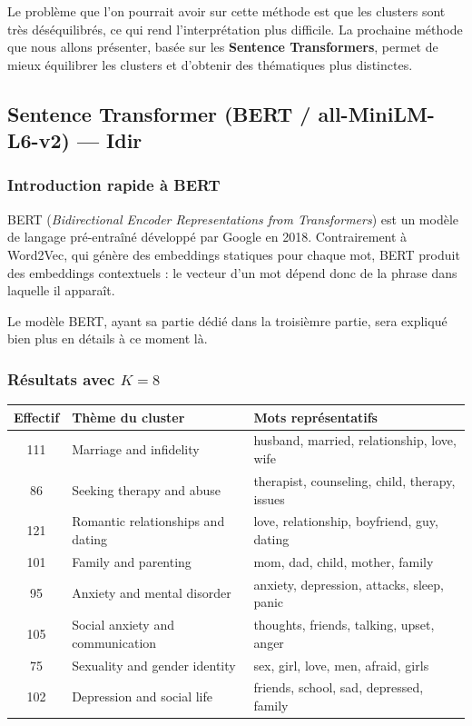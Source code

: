 \documentclass[12pt,a4paper]{report}
\begin{document}
Le problème que l'on pourrait avoir sur cette méthode est que les clusters sont très déséquilibrés, ce qui rend l'interprétation plus difficile.
La prochaine méthode que nous allons présenter, basée sur les \textbf{Sentence Transformers}, permet de mieux équilibrer les clusters et d'obtenir des thématiques plus distinctes.

\pagebreak

\subsection{Sentence Transformer (BERT / all-MiniLM-L6-v2) — Idir}

\subsubsection{Introduction rapide à BERT}
BERT (\textit{Bidirectional Encoder Representations from Transformers}) est un modèle de langage pré-entraîné développé par Google en 2018. 
Contrairement à Word2Vec, qui génère des embeddings statiques pour chaque mot, BERT produit des embeddings contextuels : le vecteur d'un mot dépend donc de la phrase dans laquelle il apparaît.

\begin{note}[Remarque]
Le modèle BERT, ayant sa partie dédié dans la troisièmre partie, sera expliqué bien plus en détails à ce moment là.
\end{note}

\subsubsection*{Résultats avec $K = 8$}

\begin{center}
\begin{tabular}{@{}cll@{}}
\toprule
\textbf{Effectif} & \textbf{Thème du cluster} & \textbf{Mots représentatifs} \\
\midrule
111 & Marriage and infidelity           & husband, married, relationship, love, wife \\
86  & Seeking therapy and abuse         & therapist, counseling, child, therapy, issues \\
121 & Romantic relationships and dating & love, relationship, boyfriend, guy, dating \\
101 & Family and parenting              & mom, dad, child, mother, family \\
95  & Anxiety and mental disorder       & anxiety, depression, attacks, sleep, panic \\
105 & Social anxiety and communication  & thoughts, friends, talking, upset, anger \\
75  & Sexuality and gender identity     & sex, girl, love, men, afraid, girls \\
102 & Depression and social life        & friends, school, sad, depressed, family \\
\bottomrule
\end{tabular}
\end{center}
\end{document}
